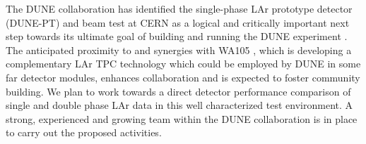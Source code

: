 The DUNE collaboration has identified the single-phase LAr prototype detector (DUNE-PT) and beam test at CERN as a logical and critically important next
step towards its ultimate goal of building and running the DUNE experiment \cite{dunecdr}. The anticipated proximity to and synergies with WA105 \cite{WA105}, which is developing a complementary LAr TPC technology which could be employed by DUNE in some far 
detector modules, 
enhances collaboration and is expected to foster community building. We plan to work towards a direct detector performance comparison of single and double phase LAr data in this well characterized test environment. 
%
A strong, experienced and growing team within the DUNE collaboration is in place to carry out the proposed activities.











